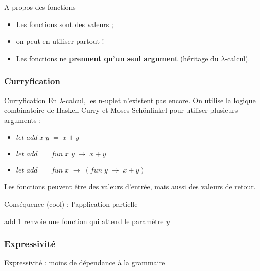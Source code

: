 \documentclass{beamer}
\begin{document}
  \begin{frame}
    
  \end{frame}

  \begin{frame}{A propos des fonctions}
    \begin{itemize}
      \item Les fonctions sont des valeurs ;
      \item on peut en utiliser partout !
      \item Les fonctions ne \textbf{prennent qu'un seul argument} (héritage du $\lambda$-calcul).
    \end{itemize}
  \end{frame}

  \begin{frame}
    
  \end{frame}

  \subsubsection{Curryfication}
  \begin{frame}{Curryfication}
    En $\lambda$-calcul, les n-uplet n'existent pas encore. On utilise la logique combinatoire de
    Haskell Curry et Moses Schönfinkel pour utiliser plusieurs arguments :
    \begin{itemize}
      \item $let \; add \; x \; y \; = \; x + y$
      \item $let \; add \; = \; fun \; x \; y \; \rightarrow \; x + y$
      \item $let \; add \; = \; fun \; x \; \rightarrow \; (fun \; y  \; \rightarrow \; x + y)$
    \end{itemize}
    Les fonctions peuvent être des valeurs d'entrée, mais aussi des valeurs de retour.
  \end{frame}

  \begin{frame}{Conséquence (cool) : l'application partielle}
    
    \alert{add 1} renvoie une fonction qui attend le paramètre $y$
  \end{frame}

  \subsubsection{Expressivité}
  \begin{frame}{Expressivité : moins de dépendance à la grammaire}
    
  \end{frame}
\end{document}
